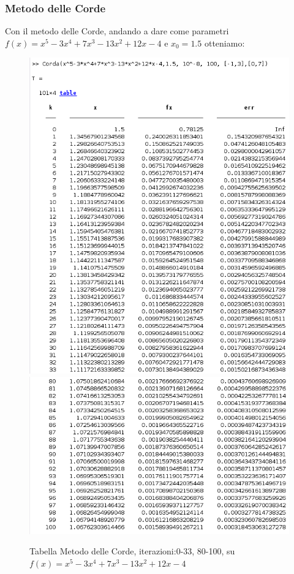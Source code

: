 \documentclass[12pt, letterpaper]{article}
\begin{document}
\newpage

\subsubsection{Metodo delle Corde}
Con il metodo delle Corde, andando a dare come parametri $f(x)=x^5-3x^4+7x^3-13x^2+12x-4$ e $x_0=1.5$ otteniamo: 
\begin{figure}[ht!]
    \includegraphics[scale=0.74]{TabellaMultiRadixCorda1.png} \\
    \includegraphics[scale=0.74]{TabellaMultiRadixCorda2.png}
    \caption{Tabella Metodo delle Corde, iterazioni:0-33, 80-100, su $f(x)=x^5-3x^4+7x^3-13x^2+12x-4$}
\end{figure}
\end{document}
